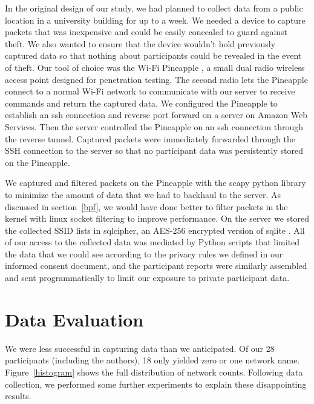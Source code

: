 \documentclass[letterpaper,twocolumn,10pt]{article}
\begin{document}
In the original design of our study, we had planned to collect data from a public location in a university building for up to a week. We needed a device to capture packets that was inexpensive and could be easily concealed to guard against theft. We also wanted to ensure that the device wouldn't hold previously captured data so that nothing about participants could be revealed in the event of theft. Our tool of choice was the Wi-Fi Pineapple \cite{pineapple}, a small dual radio wireless access point designed for penetration testing. The second radio lets the Pineapple connect to a normal Wi-Fi network to communicate with our server to receive commands and return the captured data. We configured the Pineapple to establish an ssh connection and reverse port forward on a server on Amazon Web Services. Then the server controlled the Pineapple on an ssh connection through the reverse tunnel. Captured packets were immediately forwarded through the SSH connection to the server so that no participant data was persistently stored on the Pineapple.

We captured and filtered packets on the Pineapple with the scapy python library to minimize the amount of data that we had to backhaul to the server. As discussed in section~\ref{bpf}, we would have done better to filter packets in the kernel with linux socket filtering to improve performance. On the server we stored the collected SSID lists in sqlcipher, an AES-256 encrypted version of sqlite \cite{cipher}. All of our access to the collected data was mediated by Python scripts that limited the data that we could see according to the privacy rules we defined in our informed consent document, and the participant reports were similarly assembled and sent programmatically to limit our exposure to private participant data.

\section{Data Evaluation}
We were less successful in capturing data than we anticipated. Of our 28 participants (including the authors), 18 only yielded zero or one network name. Figure~\ref{histogram} shows the full distribution of network counts. Following data collection, we performed some further experiments to explain these disappointing results.
\end{document}
